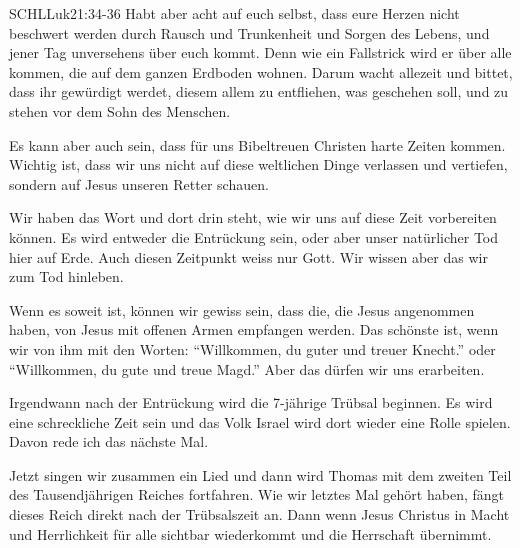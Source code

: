 \begin{otsblock}
\begin {bibelbox}{SCHL}{Luk}{21:34-36}
            Habt aber acht auf euch selbst, dass eure Herzen nicht beschwert werden durch Rausch und Trunkenheit und Sorgen des Lebens, und jener Tag unversehens über euch kommt. Denn wie ein Fallstrick wird er über alle kommen, die auf dem ganzen Erdboden wohnen. Darum wacht allezeit und bittet, dass ihr gewürdigt werdet, diesem allem zu entfliehen, was geschehen soll, und zu stehen vor dem Sohn des Menschen.
        \end{bibelbox}
        Es kann aber auch sein, dass für uns Bibeltreuen Christen harte Zeiten kommen. Wichtig ist, dass wir uns nicht auf diese weltlichen Dinge verlassen und vertiefen, sondern auf Jesus unseren Retter schauen.
        
        Wir haben das Wort und dort drin steht, wie wir uns auf diese Zeit vorbereiten können. Es wird entweder die Entrückung sein, oder aber unser natürlicher Tod hier auf Erde. Auch diesen Zeitpunkt weiss nur Gott. Wir wissen aber das wir zum Tod hinleben.

        Wenn es soweit ist, können wir gewiss sein, dass die, die Jesus angenommen haben, von Jesus mit offenen Armen empfangen werden. Das schönste ist, wenn wir von ihm mit den Worten: \enquote{Willkommen, du guter und treuer Knecht.} oder \enquote{Willkommen, du gute und treue Magd.} Aber das dürfen wir uns erarbeiten.
    \end{otsblock}
    Irgendwann nach der Entrückung wird die 7-jährige Trübsal beginnen. Es wird eine schreckliche Zeit sein und das Volk Israel wird dort wieder eine Rolle spielen. Davon rede ich das nächste Mal. 
    
    Jetzt singen wir zusammen ein Lied und dann wird Thomas mit dem zweiten Teil des Tausendjährigen Reiches fortfahren. Wie wir letztes Mal gehört haben, fängt dieses Reich direkt nach der Trübsalszeit an. Dann wenn Jesus Christus in Macht und Herrlichkeit für alle sichtbar wiederkommt und die Herrschaft übernimmt.